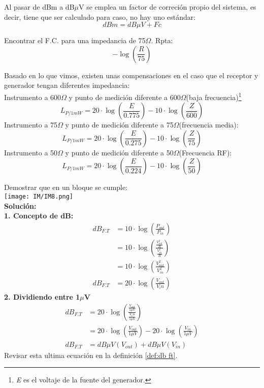 \documentclass[
	12pt, %
	fleqn, %
	a4paper, %
	oneside, %
]{LegrandOrangeBook}
\begin{document}
\begin{definition}
Al pasar de dBm a dB$\mu$V se emplea un factor de correción propio del sistema, es decir, tiene que ser calculado para caso, no hay uno estándar:
\begin{equation}
dBm=dB\mu V + Fc
\end{equation}
\end{definition}
\begin{exercise}
Encontrar el F.C. para una impedancia de 75$\Omega$. Rpta:
\begin{displaymath}
-\log\left(\frac{R}{75}\right)
\end{displaymath}
\end{exercise}
\begin{definition}
Basado en lo que vimos, existen unas compensaciones en el caso que el receptor y generador tengan diferentes impedancia:\\Instrumento a 600$\Omega$ y punto de medición diferente a 600$\Omega$(baja frecuencia)\footnote{\textit{E} es el voltaje de la fuente del generador.}
\begin{equation}
L_{P/1mW}=20\cdot\log\left(\frac{E}{0.775}\right)-10\cdot\log\left(\frac{Z}{600}\right)
\end{equation}
Instrumento a 75$\Omega$ y punto de medición diferente a 75$\Omega$(frecuencia media):
\begin{equation}
L_{P/1mW}=20\cdot\log\left(\frac{E}{0.275}\right)-10\cdot\log\left(\frac{Z}{75}\right)
\end{equation}
Instrumento a 50$\Omega$ y punto de medición diferente a 50$\Omega$(Frecuencia RF):
\begin{equation}
L_{P/1mW}=20\cdot\log\left(\frac{E}{0.224}\right)-10\cdot\log\left(\frac{Z}{50}\right)
\end{equation}
\end{definition}
\begin{example}[Demostraciones]
Demostrar que en un bloque se cumple:\\
\texttt{[image: IM/IM8.png]}\\
\textbf{Solución:}\\
\textbf{1. Concepto de dB:}
\begin{align}
dB_{F.T}&=10\cdot\log\left(\frac{P_{out}}{P_{in}}\right)\\
&=10\cdot\log\left(\frac{\frac{V_{out}^2}{R}}{\frac{V_{in}^2}{R}}\right)\\
&=10\cdot\log\left(\frac{V_{out}^2}{V_{in}^2}\right)\\
dB_{F.T}&=20\cdot\log\left(\frac{V_{out}}{V_in}\right)
\end{align}
\textbf{2. Dividiendo entre 1$\mu$V}
\begin{align}
dB_{F.T}&=20\cdot\log\left(\frac{\frac{V_{out}}{1\mu V}}{\frac{V_in}{1\mu V}}\right)\\
&=20\cdot\log\left(\frac{V_{out}}{1\mu V}\right)-20\cdot\log\left(\frac{V_{in}}{1\mu V}\right)\\
dB_{F.T}&=dB\mu V(V_{out})+dB\mu V(V_{in})
\end{align}
Revisar esta ultima ecuación en la definición \ref{def:db ft}.
\end{example}
\end{document}
